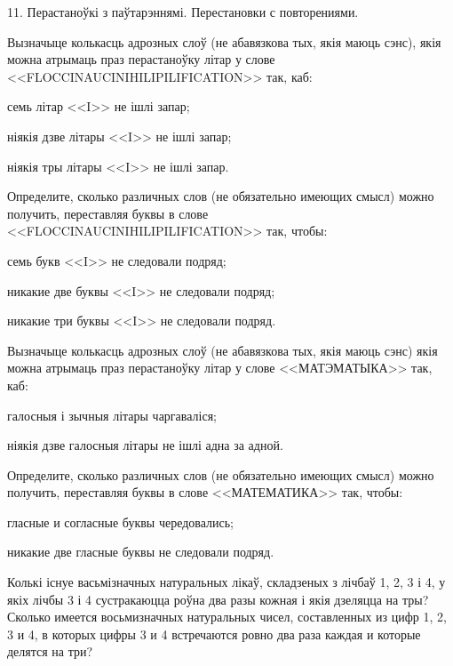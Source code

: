 



\biLangHeader
{11. Перастаноўкі з паўтарэннямі.}
{Перестановки с повторениями.}

\begin{problemList}

\problemItemSimple
{Вызначыце колькасць адрозных слоў (не абавязкова тых, якія маюць сэнс), якія можна атрымаць
праз перастаноўку літар у слове <<FLOCCINAUCINIHILIPILIFICATION>> так, каб:
\begin{belarusianEnumerate}
  \item семь літар <<I>> не ішлі запар;
  \item ніякія дзве літары <<I>> не ішлі запар;
  \item ніякія тры літары <<I>> не ішлі запар.
\end{belarusianEnumerate}
}
{Определите, сколько различных слов (не обязательно имеющих смысл) можно
получить, переставляя буквы в слове <<FLOCCINAUCINIHILIPILIFICATION>>
так, чтобы:
\begin{russianEnumerate}
  \item семь букв <<I>> не следовали подряд;
  \item никакие две буквы <<I>> не следовали подряд;
  \item никакие три буквы <<I>> не следовали подряд.
\end{russianEnumerate}}

\bigskip

\problemItemSimple
{Вызначыце колькасць адрозных слоў (не абавязкова тых, якія маюць сэнс) якія можна атрымаць
праз перастаноўку літар у слове <<МАТЭМАТЫКА>> так, каб:
\begin{belarusianEnumerate}
  \item галосныя і зычныя літары чаргаваліся;
  \item ніякія дзве галосныя літары не ішлі адна за адной.
\end{belarusianEnumerate}
}
{Определите, сколько различных слов (не обязательно имеющих смысл) можно
получить, переставляя буквы в слове <<МАТЕМАТИКА>>
так, чтобы:
\begin{russianEnumerate}
  \item гласные и согласные буквы чередовались;
  \item никакие две гласные буквы не следовали подряд.
\end{russianEnumerate}}

\bigskip

\problemItemSimple
{Колькі існуе васьмізначных натуральных лікаў, складзеных з лічбаў 1, 2, 3 і 4,
у якіх лічбы 3 і 4 сустракаюцца роўна два разы кожная і якія дзеляцца на тры?}
{Сколько имеется восьмизначных натуральных чисел, составленных
из цифр 1, 2, 3 и 4, в которых цифры 3 и 4 встречаются ровно
два раза каждая и которые делятся на три?}


\end{problemList}
